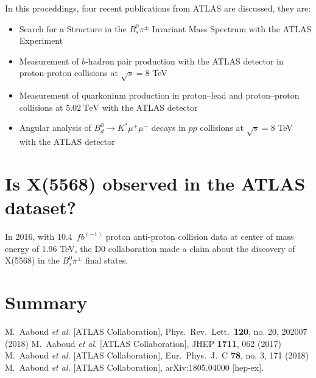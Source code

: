 \documentclass[epj]{webofc}
\begin{document}
In this proceddings, four recent publications from ATLAS are discussed, they are:
\begin{itemize}
  \item Search for a Structure in the $B^0_s \pi^\pm$ Invariant Mass Spectrum with the ATLAS Experiment~\cite{x5568}
  \item Measurement of $b$-hadron pair production with the ATLAS detector in proton-proton collisions at $\sqrt{s}=8$ TeV~\cite{bpair}
  \item Measurement of quarkonium production in proton–lead and proton–proton collisions at $5.02~\mathrm {TeV}$ with the ATLAS detector~\cite{quark_pro}
  \item Angular analysis of $B^0_d \rightarrow K^{*}\mu^+\mu^-$ decays in $pp$ collisions at $\sqrt{s}= 8$ TeV with the ATLAS detector~\cite{kmumu}
\end{itemize}

\section{Is X(5568) observed in the ATLAS dataset?}

In 2016, with 10.4~$fb^(-1)$ proton anti-proton collision data at center of mass energy of 1.96 TeV, the D0 collaboration made a claim about
the discovery of X(5568) in the $B^0_s \pi^\pm$ final states. 

\label{5568}

\section{Summary}
\label{sum}

\begin{acknowledgement}

\end{acknowledgement}
%
% 
%
%
\begin{thebibliography}{00}
%
%
  M.~Aaboud {\it et al.} [ATLAS Collaboration],
  Phys.\ Rev.\ Lett.\  {\bf 120}, no. 20, 202007 (2018)
  M.~Aaboud {\it et al.} [ATLAS Collaboration],
  JHEP {\bf 1711}, 062 (2017)
  M.~Aaboud {\it et al.} [ATLAS Collaboration],
  Eur.\ Phys.\ J.\ C {\bf 78}, no. 3, 171 (2018)
  M.~Aaboud {\it et al.} [ATLAS Collaboration],
  arXiv:1805.04000 [hep-ex].
\end{thebibliography}
\end{document}

